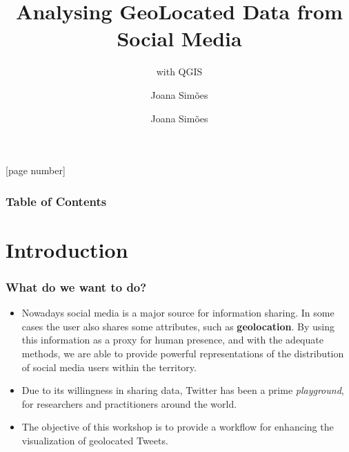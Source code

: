 \documentclass[hyperref={pdfpagelabels=true}]{beamer}
\title{Analysing GeoLocated Data from Social Media}
\subtitle{with QGIS}
\author{Joana Sim\~{o}es}
\author[shortname]{Joana Sim\~{o}es \inst{1}}
\institute[shortinst]{\inst{1} Bdigital, CASA, CICS.NOVA}
\begin{document}
[page number]
\begin{frame}

\begin{titlepage}
\end{titlepage}

\end{frame} 
  
 
\begin{frame}
\frametitle{Table of Contents}
\tableofcontents%
\end{frame}

\section{Introduction} 
\begin{frame}
\frametitle{What do we want to do?}

\begin{itemize}
  \item<1->Nowadays social media is a major source for information sharing. In some cases the user also shares some attributes, such as \textbf{geolocation}. By using this information as a proxy for human presence, and with the adequate methods, we are able to provide powerful representations of the distribution of social media users within the territory.
  \item<2->Due to its willingness in sharing data, Twitter has been a prime \textit{playground}, for researchers and practitioners around the world.
  \item<3->The objective of this workshop is to provide a workflow for enhancing the visualization of geolocated Tweets.
  \end{itemize}

\end{frame}
\end{document}
